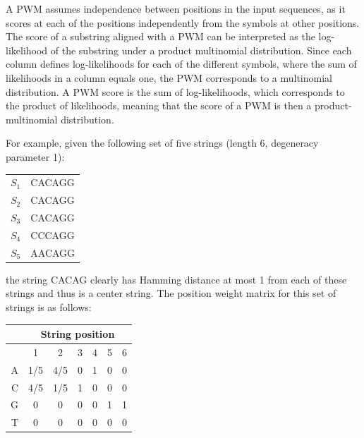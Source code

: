 A PWM assumes independence between positions in the input sequences, as it scores at each of the positions independently from the symbols at other positions. The score of a substring aligned with a PWM can be interpreted as the log-likelihood of the substring under a product multinomial distribution. Since each column defines log-likelihoods for each of the different symbols, where the sum of likelihoods in a column equals one, the PWM corresponds to a multinomial distribution. A PWM score is the sum of log-likelihoods, which corresponds to the product of likelihoods, meaning that the score of a PWM is then a product-multinomial distribution. 

For example, given the following set of five strings (length 6, degeneracy parameter 1):

\begin{table}[h!]
\begin{center} {
	\begin{tabular}{rl}     
	$S_1$ & CACAGG \\
	$S_2$ & CACAGG \\
	$S_3$ & CACAGG \\
	$S_4$ & CCCAGG \\
	$S_5$ & AACAGG \\
	\end{tabular}}
	\end{center}
\end{table}

\noindent the string CACAG clearly has Hamming distance at most 1 from each of these strings and thus is a center string. The position weight matrix for this set of strings is as follows:

\begin{table}[h!]
\begin{center} {
	\begin{tabular}{|r|cccccc|}     
	\hline
	~ & \multicolumn{6}{|c|}{String position} \\
	\hline
	~ & 1 & 2 & 3 & 4 & 5 & 6 \\
	\hline
	\hline	
	A & 1/5 & 4/5 & $0$ & 1 & 0 & 0\\ 
	C & 4/5 & 1/5 & 1 & 0 & 0 & 0 \\ 
	G & 0 & 0 & 0 & 0 & 1 & 1 \\ 
	T & 0 & 0 & 0 & 0 & 0 & 0 \\ 
		\hline
	\end{tabular}}
	\end{center}
\end{table}

